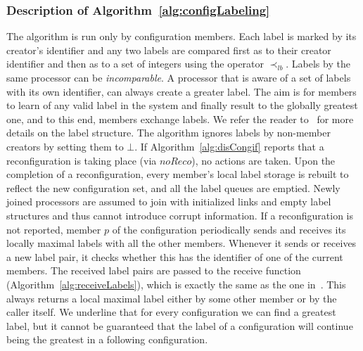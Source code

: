 \documentclass[11pt]{article}
\newcommand{\noReconfig}{noReco}
\begin{document}
\begin{algorithm*}[t!]
\begin{small}
{         \label{ln:remove}

         \label{ln:cancelMax}

     \label{ln:adopt}

      \label{ln:useOwnLabel} 


}

\end{small}

\end{algorithm*}


\subsubsection{Description of Algorithm~\ref{alg:configLabeling}}



The algorithm is run only by configuration members.
Each label is marked by its creator's identifier and any two labels are compared first as to their creator identifier and then as to a set of integers using the operator $\prec_{lb}$. 
Labels by the same processor can be \emph{incomparable}.
A processor that is aware of a set of labels with its own identifier, can always create a greater label.
The aim is for members to learn of any valid label in the system and finally result to the globally greatest one, and to this end, members exchange labels.
We refer the reader to~\cite{SSVS} for more details on the label structure. 
The algorithm ignores labels by non-member creators by setting them to $\bot$.
If Algorithm~\ref{alg:disCongif} reports that a reconfiguration is taking place (via $\noReconfig$), no actions are taken.
Upon the completion of a reconfiguration, every member's local label storage is rebuilt to reflect the new configuration set, and all the label queues are emptied. 
Newly joined processors are assumed to join with initialized links and empty label structures and thus cannot introduce corrupt information. 
If a reconfiguration is not reported, member $p$ of the configuration periodically sends and receives its locally maximal labels with all the other members.
Whenever it sends or receives a new label pair, it checks whether this has the identifier of one of the current members. 
The received label pairs are passed to the receive function (Algorithm~\ref{alg:receiveLabels}), which is exactly the same as the one in~\cite{SSVS}.
This always returns a local maximal label either by some other member or by the caller itself. 
We underline that for every configuration we can find a greatest label, but it cannot be guaranteed that the label of a configuration will continue being the greatest in a following configuration.
\end{document}
